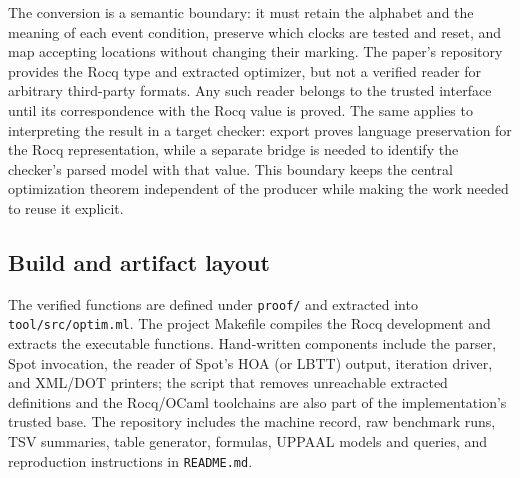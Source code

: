 The conversion is a semantic boundary: it must retain the alphabet and the
meaning of each event condition, preserve which clocks are tested and reset,
and map accepting locations without changing their marking. The paper's
repository provides the Rocq type and extracted optimizer, but not a verified
reader for arbitrary third-party formats. Any such reader belongs to the
trusted interface until its correspondence with the Rocq value is proved. The
same applies to interpreting the result in a target checker: export proves
language preservation for the Rocq representation, while a separate bridge is
needed to identify the checker's parsed model with that value. This boundary
keeps the central optimization theorem independent of the producer while making the
work needed to reuse it explicit.


\subsection{Build and artifact layout}\label{sec:layout}
The verified functions are defined under \texttt{proof/} and extracted into
\texttt{tool/src/optim.ml}. The project Makefile compiles the Rocq
development and extracts the executable functions. Hand-written components
include the parser, Spot invocation, the reader of Spot's HOA (or LBTT) output, iteration driver, and
XML/DOT printers; the script that removes unreachable extracted definitions
and the Rocq/OCaml toolchains are also part of the implementation's trusted
base. The repository includes the machine record, raw benchmark runs, TSV
summaries, table generator, formulas, UPPAAL models and queries, and
reproduction instructions in \texttt{README.md}.


